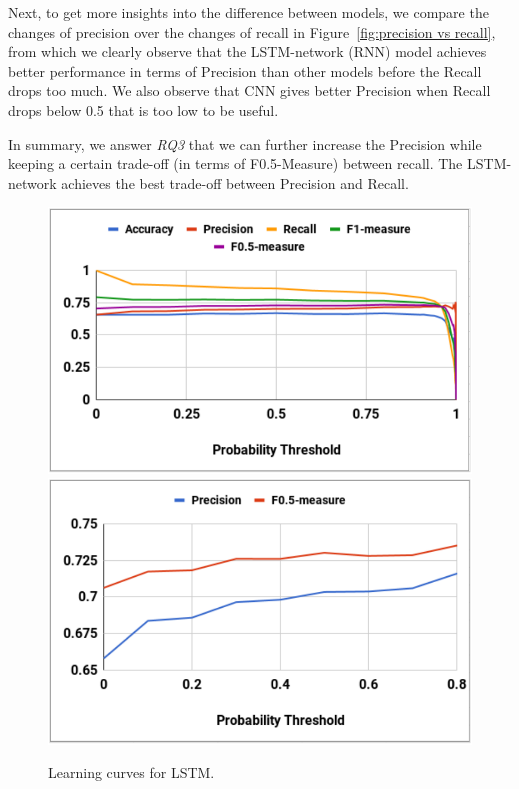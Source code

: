 Next, to get more insights into the difference between models, we compare the changes of precision over the changes of recall in Figure~\ref{fig:precision vs recall}, from which we clearly observe that the LSTM-network (RNN) model achieves better performance in terms of Precision than other models before the Recall drops too much. We also observe that CNN gives better Precision when Recall drops below 0.5 that is too low to be useful.

In summary, we answer \textit{RQ3} that we can further increase the Precision while keeping a certain trade-off (in terms of F0.5-Measure) between recall. The LSTM-network achieves the best trade-off between Precision and Recall.

\begin{figure}[H]
\centering
\includegraphics[scale=0.58]{figures/result_rnn1.pdf}
\includegraphics[scale=0.58]{figures/result_rnn2.pdf}
\caption{Learning curves for LSTM.}
\label{fig:learning curve of lstm}
\end{figure}
